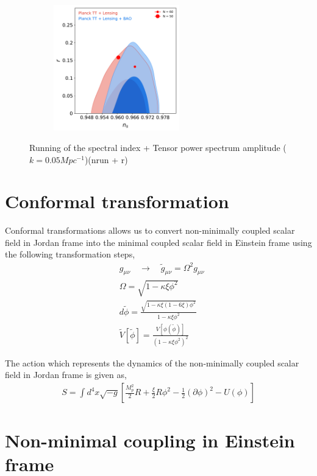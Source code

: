 \begin{figure}[H]
\begin{subfigure}[b]{.5\textwidth}
\end{subfigure}
\begin{subfigure}[b]{.5\textwidth}
\centering
\includegraphics[width=0.6\textwidth]{./figures/fig3.pdf}
\end{subfigure}
\caption{Running of the spectral index + Tensor power spectrum amplitude ($k = 0.05 Mpc^{-1}$)(nrun + r)}
\end{figure}

\section{Conformal transformation}
Conformal transformations allows us to convert non-minimally coupled scalar field in Jordan frame into the minimal coupled scalar field in Einstein frame using the following transformation steps,
\begin{align}
& g_{\mu\nu} \quad \rightarrow\quad \tilde{g}_{\mu\nu} = \Omega^{2}g_{\mu\nu}\\
& \Omega = \sqrt{1 - \kappa \xi \phi^{2}}\\
& d\tilde{\phi} = \frac{\sqrt{1 - \kappa \xi \left(1-6\xi\right)\phi^{2}}}{1 - \kappa \xi \phi^{2}}\\
& \tilde{V}\left[\tilde{\phi}\right] = \frac{V\left[\phi\left(\tilde{\phi}\right)\right]}{\left(1 - \kappa \xi \phi^{2}\right)^{2}}
\end{align}

The action which represents the dynamics of the non-minimally coupled scalar field in Jordan frame is given as,
\begin{align}
S = \int d^{4}x \sqrt{-g}\left[\frac{M_{p}^{2}}{2}R + \frac{\xi}{2}R\phi^{2} - \frac{1}{2}\left(\partial\phi\right)^{2} - U\left(\phi\right)\right]
\end{align}



\section{Non-minimal coupling in Einstein frame}


